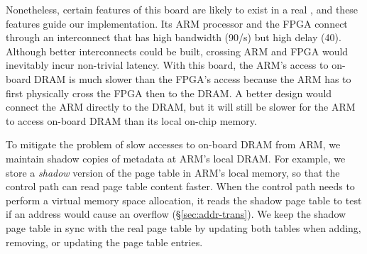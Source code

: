 Nonetheless, certain features of this board are likely to exist in a real \sysboard,
and these features guide our implementation.
Its ARM processor and the FPGA connect through an interconnect that has high bandwidth (90\GB/s) but high delay (40\mus).
Although better interconnects could be built, crossing ARM and FPGA would inevitably incur non-trivial latency.
With this board, the ARM's access to on-board DRAM is much slower than the FPGA's access because the ARM has to first physically cross the FPGA then to the DRAM.
A better design would connect the ARM directly to the DRAM, 
but it will still be slower for the ARM to access on-board DRAM than its local on-chip memory.


%

To mitigate the problem of slow accesses to on-board DRAM from ARM,
we maintain shadow copies of metadata at ARM's local DRAM.
For example, we store a {\em shadow} version of the page table in ARM's local memory,
so that the control path can read page table content faster.
When the control path needs to perform a virtual memory space allocation, it reads the shadow page table to test if an address would cause an overflow (\S\ref{sec:addr-trans}).
We keep the shadow page table in sync with the real page table by updating both tables when adding, removing, or updating the page table entries.
%

